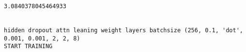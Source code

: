 \documentclass[11pt]{article}
\begin{document}
    \begin{center}
    \end{center}
    { \hspace*{\fill} \\}
    
    \begin{center}
    \end{center}
    { \hspace*{\fill} \\}
    
    \begin{Verbatim}[commandchars=\\\{\}]
3.0840378045464933


hidden dropout attn leaning weight layers batchsize (256, 0.1, 'dot', 0.001, 0.001, 2, 2, 8)
START TRAINING



    \end{Verbatim}

    \begin{center}
    \end{center}
    { \hspace*{\fill} \\}
    
    \begin{center}
    \end{center}
    { \hspace*{\fill} \\}
    
    \begin{center}
    \end{center}
    { \hspace*{\fill} \\}
    
    \begin{center}
    \end{center}
    { \hspace*{\fill} \\}
    
    \begin{center}
    \end{center}
    { \hspace*{\fill} \\}
    
\end{document}
